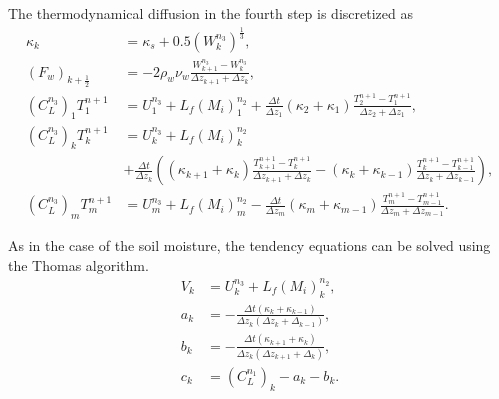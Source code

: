The thermodynamical diffusion in the fourth step is discretized as
\begin{align}
  \kappa_k &= \kappa_s + 0.5 (W^{n_3}_k)^\frac{1}{3}, \\
%
  (F_w)_{k+\frac{1}{2}} &= - 2\rho_w\nu_w\frac{W^{n_3}_{k+1}-W^{n_3}_k}{\Delta z_{k+1}+\Delta z_k}, \\
%
  (C_L^{n_3})_1 T^{n+1}_1 &= U^{n_3}_1 + L_f(M_i)^{n_2}_1
  + \frac{\Delta t}{\Delta z_1} (\kappa_2+\kappa_1) \frac{T^{n+1}_2-T^{n+1}_1}{\Delta z_2+\Delta z_1}, \\
%
  (C_L^{n_3})_k T^{n+1}_k &= U^{n_3}_k + L_f(M_i)^{n_2}_k  \nonumber\\&
  + \frac{\Delta t}{\Delta z_k} \left( (\kappa_{k+1}+\kappa_k) \frac{T^{n+1}_{k+1}-T^{n+1}_k}{\Delta z_{k+1}+\Delta z_k} - (\kappa_k+\kappa_{k-1}) \frac{T^{n+1}_k-T^{n+1}_{k-1}}{\Delta z_k+\Delta z_{k-1}} \right), \\
%
  (C_L^{n_3})_m T^{n+1}_m &= U^{n_3}_m + L_f(M_i)^{n_2}_m
  - \frac{\Delta t}{\Delta z_m} (\kappa_m+\kappa_{m-1}) \frac{T^{n+1}_m-T^{n+1}_{m-1}}{\Delta z_m+\Delta z_{m-1}}.
\end{align}

As in the case of the soil moisture, the tendency equations can be solved using the Thomas algorithm.
\begin{align}
 V_k &= U^{n_3}_k + L_f (M_i)^{n_2}_k, \\
 a_k &= - \frac{\Delta t (\kappa_k+\kappa_{k-1})}{\Delta z_k(\Delta z_k+\Delta_{k-1})}, \\
 b_k &= - \frac{\Delta t (\kappa_{k+1}+\kappa_k)}{\Delta z_k(\Delta z_{k+1}+\Delta_k)}, \\
 c_k &= (C_L^{n_1})_k - a_k - b_k.
\end{align}

